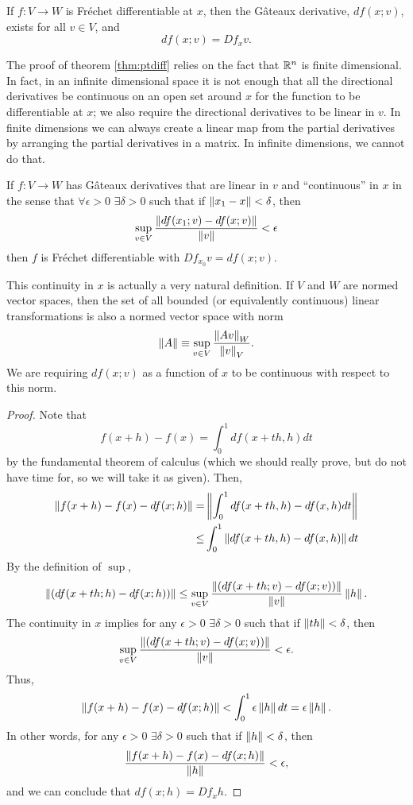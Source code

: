 \begin{lemma}\label{lem:fregat}
  If $f: V \to W$ is Fr\'{e}chet differentiable at $x$, then the
  G\^{a}teaux derivative, $df(x;v)$, exists for all $v \in V$, and
  \[ df(x;v) = Df_x v. \]
\end{lemma}
The proof of theorem \ref{thm:ptdiff} relies on the fact that $\mathbb{R}^n$
is finite dimensional. In fact, in an infinite dimensional space it is
not enough that all the directional derivatives be continuous on an
open set around $x$ for the function to be differentiable at $x$; we
also require the directional derivatives to be linear in $v$. In
finite dimensions we can always create a linear map from the partial
derivatives by arranging the partial derivatives in a matrix. In
infinite dimensions, we cannot do that. 
\begin{lemma}\label{lem:gatfre}
  If $f: V \to W$ has G\^{a}teaux derivatives that are linear in $v$
  and ``continuous'' in $x$ in the sense that $\forall \epsilon>0$
  $\exists \delta > 0$ such that if $\left\Vert {x_1 - x} \right\Vert < \delta$, then
  \begin{align*}
    \sup_{v \in V} \frac{\left\Vert {df(x_1;v) - df(x;v)} \right\Vert}{\left\Vert {v} \right\Vert} < \epsilon
  \end{align*}
  then $f$ is Fr\'{e}chet differentiable with $Df_{x_0} v = df(x;v)$.
\end{lemma}
\begin{remark}
  This continuity in $x$ is actually a very natural definition. If $V$
  and $W$ are normed vector spaces, then the set of all bounded (or
  equivalently continuous) linear transformations is also a normed
  vector space with norm 
  \[ \left\Vert {A} \right\Vert \equiv \sup_{v \in V} \frac{\left\Vert {Av} \right\Vert_W}{\left\Vert {v} \right\Vert_V}. \]
  We are requiring $df(x;v)$ as a function of $x$ to be continuous with 
  respect to this norm. 
\end{remark}
\begin{proof}
  Note that
  \[ f(x+h) - f(x) = \int_0^1 df(x+th,h) dt \]
  by the fundamental theorem of calculus (which we should really
  prove, but do not have time for, so we will take it as given). Then,
  \begin{align*}
    \left\Vert { f(x+h) - f(x) - df(x;h)} \right\Vert = & \left\Vert { \int_0^1 df(x+th,h) -
      df(x,h) dt} \right\Vert \\
    \leq & \int_0^1 \left\Vert {df(x+th,h) -df(x,h)} \right\Vert dt
  \end{align*}
  By the definition of $\sup$, 
  \[ \left\Vert {\left(df(x+th;h) - df(x;h) \right)} \right\Vert \leq \sup_{v \in V}
  \frac{\left\Vert {\left(df(x+th;v) - df(x;v)
      \right)} \right\Vert}{\left\Vert {v} \right\Vert}\left\Vert {h} \right\Vert. \] 
  The continuity in $x$ implies for any $\epsilon>0$ $\exists
  \delta > 0$ such that if $\left\Vert {th} \right\Vert < \delta$, then 
  \[ \sup_{v \in V}
  \frac{\left\Vert {\left(df(x+th;v) - df(x;v) \right)} \right\Vert}{\left\Vert {v} \right\Vert} <
  \epsilon. \]
  Thus,
  \[ 
  \left\Vert { f(x+h) - f(x) - df(x;h)} \right\Vert < \int_0^1 \epsilon \left\Vert {h} \right\Vert dt =
  \epsilon \left\Vert {h} \right\Vert. \]
  In other words, for any $\epsilon>0$ $\exists \delta>0$ such that
  if $\left\Vert {h} \right\Vert < \delta$, then 
  \[ \frac{\left\Vert {f(x+h) - f(x) - df(x;h)} \right\Vert} {\left\Vert {h} \right\Vert} < \epsilon, \]
  and we can conclude that $df(x;h) = Df_x h$. 
\end{proof}
